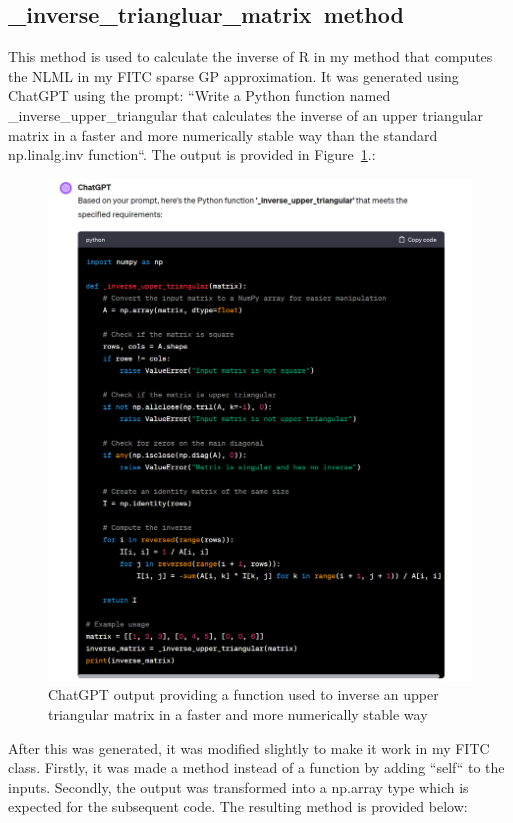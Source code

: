 \documentclass[12pt]{article}
\begin{document}
    \subsection{\_inverse\_triangluar\_matrix\ method}
    This method is used to calculate the inverse of R in my method that computes the NLML in my FITC sparse GP approximation.
    It was generated using ChatGPT using the prompt: ``Write a Python function named \_inverse\_upper\_triangular that calculates the inverse of an upper triangular matrix in a faster and more numerically stable way than the standard np.linalg.inv function``.
    The output is provided in Figure~\ref{fig:chat-iut}.:
    \begin{figure}[htbp]
        \centering
        \includegraphics[width=1\linewidth]{figures/chat-iut/chat-iut.png}
        \caption{ChatGPT output providing a function used to inverse an upper triangular matrix in a faster and more numerically stable way}
        \label{fig:chat-iut}
    \end{figure}



    After this was generated, it was modified slightly to make it work in my FITC class.
    Firstly, it was made a method instead of a function by adding ``self`` to the inputs.
    Secondly, the output was transformed into a np.array type which is expected for the subsequent code.
    The resulting method is provided below:
\end{document}
